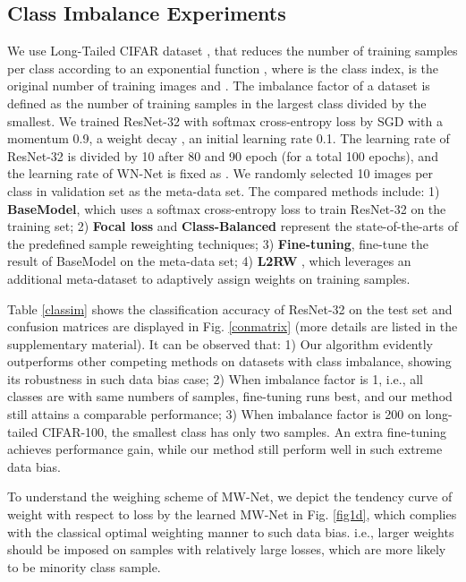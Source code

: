 \documentclass{article}
\begin{document}
	\subsection{Class Imbalance Experiments}\label{imbalance}\vspace{0mm}
	We use Long-Tailed CIFAR dataset \cite{cui2019class}, that reduces the number of training samples per class according to an exponential function , where  is the class index,  is the original number of training images and . The imbalance factor of a dataset is defined as the number of training samples in the largest class divided by the smallest.  We trained ResNet-32 \cite{he2016deep} with softmax cross-entropy loss by SGD with a momentum 0.9, a weight decay , an initial learning rate 0.1. The learning rate of ResNet-32 is divided by 10 after 80 and 90 epoch (for a total 100 epochs), and the learning rate of WN-Net is fixed as . We randomly selected 10 images per class in validation set as the meta-data set. The compared methods include: 1) \textbf{BaseModel}, which uses a softmax cross-entropy loss to train ResNet-32 on the training set; 2) \textbf{Focal loss} \cite{lin2018focal} and \textbf{Class-Balanced} \cite{cui2019class} represent the state-of-the-arts of the predefined sample reweighting techniques; 3) \textbf{Fine-tuning}, fine-tune the result of BaseModel on the meta-data set;
	4) \textbf{L2RW} \cite{ren2018learning}, which leverages an additional meta-dataset to adaptively assign weights on training samples.\vspace{0mm}
	
	Table \ref{classim} shows the classification accuracy of ResNet-32 on the test set and confusion matrices are displayed in Fig. \ref{conmatrix} (more details are listed in the supplementary material). It can be observed that: 1) Our algorithm evidently outperforms other competing methods on datasets with class imbalance, showing its robustness in such data bias case; 2) When imbalance factor is 1, i.e., all classes are with same numbers of samples, fine-tuning runs best, and our method still attains a comparable performance; 3) When imbalance factor is 200 on long-tailed CIFAR-100, the smallest class has only two samples. An extra fine-tuning achieves performance gain, while our method still perform well in such extreme data bias.\vspace{0mm}
	
	To understand the weighing scheme of MW-Net, we depict the tendency curve of weight with respect to loss by the learned MW-Net in Fig. \ref{fig1d}, which complies with the classical optimal weighting manner to such data bias. i.e., larger weights should be imposed on samples with relatively large losses, which are more likely to be minority class sample.
\end{document}

